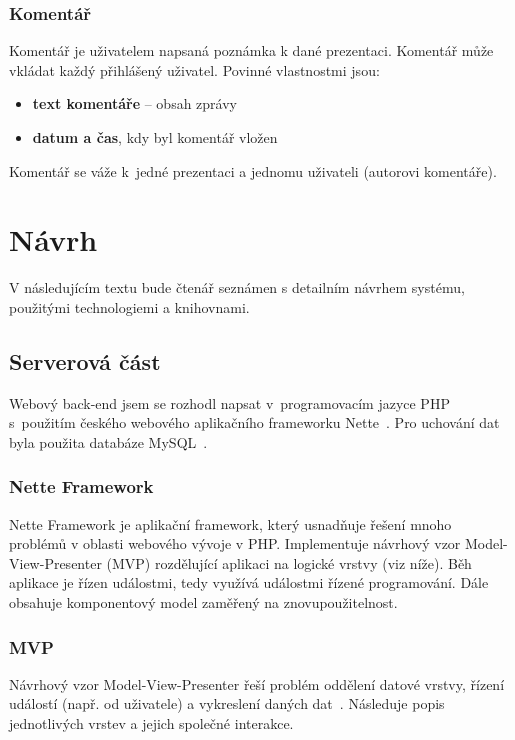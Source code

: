 \documentclass[11pt,twoside,a4paper]{book}
\newcommand*{\nomExpl}[2]{#2 (#1)\nomenclature{#1}{#2}} 	%
\begin{document}
\subsection{Komentář}
Komentář je uživatelem napsaná poznámka k dané prezentaci. Komentář může vkládat každý přihlášený uživatel. Povinné
vlastnostmi jsou:

\begin{itemize}
	\item \textbf{text komentáře} – obsah zprávy
	\item \textbf{datum a čas}, kdy byl komentář vložen
\end{itemize}

Komentář se váže k~jedné prezentaci a jednomu uživateli (autorovi komentáře).



\chapter{Návrh}
V následujícím textu bude čtenář seznámen s detailním návrhem systému, použitými technologiemi a knihovnami.

\section{Serverová část}
Webový back-end jsem se rozhodl napsat v~programovacím jazyce PHP s~použitím českého webového aplikačního frameworku Nette~\cite{nette}. Pro uchování dat byla použita databáze MySQL~\cite{mysql}.

\subsection{Nette Framework}
Nette Framework je aplikační framework, který usnadňuje řešení mnoho problémů v oblasti webového vývoje v PHP. Implementuje návrhový vzor \nomExpl{MVP}{Model-View-Presenter} rozdělující aplikaci na logické vrstvy (viz níže). Běh aplikace je řízen událostmi, tedy využívá událostmi řízené programování. Dále obsahuje komponentový model zaměřený na znovupoužitelnost.

\subsection{MVP}
Návrhový vzor Model-View-Presenter řeší problém oddělení datové vrstvy, řízení událostí (např. od uživatele) a vykreslení daných dat~\cite{mvp}. Následuje popis jednotlivých vrstev a jejich společné interakce.
\end{document}
